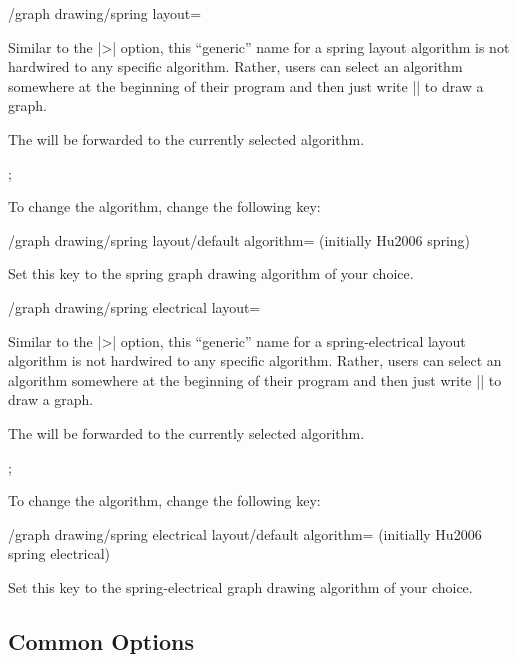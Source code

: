 \begin{key}{/graph drawing/spring layout=}
  
  Similar to the |>| option, this ``generic'' name for a spring layout
  algorithm is not hardwired to any specific algorithm. Rather, users
  can select an algorithm somewhere at the beginning of their program
  and then just write || to draw a graph.

  The  will be forwarded to the currently selected
  algorithm.
\begin{codeexample}[]
\tikz {};    
\end{codeexample}
  
  To change the algorithm, change the following key:
  \begin{key}{/graph drawing/spring layout/default
  algorithm= (initially Hu2006 spring)}

    Set this key to the spring graph drawing algorithm of your choice.
  \end{key}
\end{key}

\begin{key}{/graph drawing/spring electrical layout=}

  Similar to the |>| option, this ``generic'' name for a 
  spring-electrical layout algorithm is not hardwired to any specific
  algorithm. Rather, users can select an algorithm somewhere at the
  beginning of their program and then just write 
  || to draw a graph.

  The  will be forwarded to the currently selected
  algorithm.
  \begin{codeexample}[]
\tikz {};
  \end{codeexample}

  To change the algorithm, change the following key:
  \begin{key}{/graph drawing/spring electrical layout/default
    algorithm= (initially Hu2006 spring electrical)}

    Set this key to the spring-electrical graph drawing algorithm of 
    your choice.
  \end{key}
\end{key}

\subsection{Common Options}


